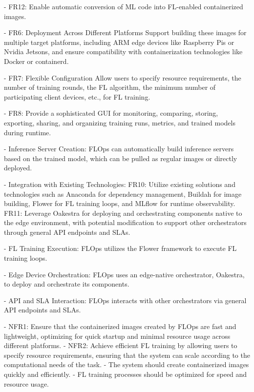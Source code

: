 - FR12: Enable automatic conversion of ML code into FL-enabled containerized images.

- FR6: Deployment Across Different Platforms
    Support building these images for multiple target platforms, including ARM edge devices like Raspberry Pis or Nvidia Jetsons,
    and ensure compatibility with containerization technologies like Docker or containerd.

- FR7: Flexible Configuration
    Allow users to specify resource requirements, the number of training rounds, the FL algorithm, the minimum number of participating client devices, etc., for FL training.

- FR8: Provide a sophisticated GUI for monitoring, comparing, storing, exporting, sharing, and organizing training runs, metrics, and trained models during runtime.

- Inference Server Creation:
    FLOps can automatically build inference servers based on the trained model, which can be pulled as regular images or directly deployed.

- Integration with Existing Technologies:
    FR10: Utilize existing solutions and technologies such as Anaconda for dependency management, Buildah for image building, Flower for FL training loops, and MLflow for runtime observability.
    FR11: Leverage Oakestra for deploying and orchestrating components native to the edge environment, with potential modification to support other orchestrators through general API endpoints and SLAs.

- FL Training Execution:
    FLOps utilizes the Flower framework to execute FL training loops.

- Edge Device Orchestration:
    FLOps uses an edge-native orchestrator, Oakestra, to deploy and orchestrate its components.

- API and SLA Interaction:
    FLOps interacts with other orchestrators via general API endpoints and SLAs.



- NFR1: Ensure that the containerized images created by FLOps are fast and lightweight, optimizing for quick startup and minimal resource usage across different platforms.
- NFR2: Achieve efficient FL training by allowing users to specify resource requirements, ensuring that the system can scale according to the computational needs of the task.
- The system should create containerized images quickly and efficiently.
- FL training processes should be optimized for speed and resource usage.

